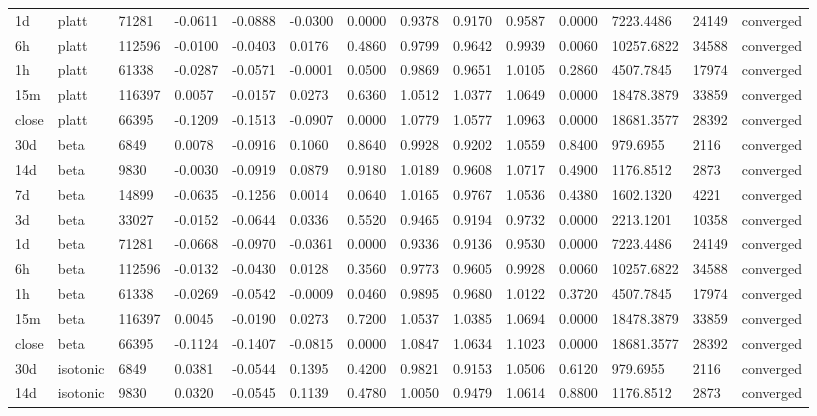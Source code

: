 \begin{tabular}{llllllllllllll}
1d & platt & 71281 & -0.0611 & -0.0888 & -0.0300 & 0.0000 & 0.9378 & 0.9170 & 0.9587 & 0.0000 & 7223.4486 & 24149 & converged \\
6h & platt & 112596 & -0.0100 & -0.0403 & 0.0176 & 0.4860 & 0.9799 & 0.9642 & 0.9939 & 0.0060 & 10257.6822 & 34588 & converged \\
1h & platt & 61338 & -0.0287 & -0.0571 & -0.0001 & 0.0500 & 0.9869 & 0.9651 & 1.0105 & 0.2860 & 4507.7845 & 17974 & converged \\
15m & platt & 116397 & 0.0057 & -0.0157 & 0.0273 & 0.6360 & 1.0512 & 1.0377 & 1.0649 & 0.0000 & 18478.3879 & 33859 & converged \\
close & platt & 66395 & -0.1209 & -0.1513 & -0.0907 & 0.0000 & 1.0779 & 1.0577 & 1.0963 & 0.0000 & 18681.3577 & 28392 & converged \\
30d & beta & 6849 & 0.0078 & -0.0916 & 0.1060 & 0.8640 & 0.9928 & 0.9202 & 1.0559 & 0.8400 & 979.6955 & 2116 & converged \\
14d & beta & 9830 & -0.0030 & -0.0919 & 0.0879 & 0.9180 & 1.0189 & 0.9608 & 1.0717 & 0.4900 & 1176.8512 & 2873 & converged \\
7d & beta & 14899 & -0.0635 & -0.1256 & 0.0014 & 0.0640 & 1.0165 & 0.9767 & 1.0536 & 0.4380 & 1602.1320 & 4221 & converged \\
3d & beta & 33027 & -0.0152 & -0.0644 & 0.0336 & 0.5520 & 0.9465 & 0.9194 & 0.9732 & 0.0000 & 2213.1201 & 10358 & converged \\
1d & beta & 71281 & -0.0668 & -0.0970 & -0.0361 & 0.0000 & 0.9336 & 0.9136 & 0.9530 & 0.0000 & 7223.4486 & 24149 & converged \\
6h & beta & 112596 & -0.0132 & -0.0430 & 0.0128 & 0.3560 & 0.9773 & 0.9605 & 0.9928 & 0.0060 & 10257.6822 & 34588 & converged \\
1h & beta & 61338 & -0.0269 & -0.0542 & -0.0009 & 0.0460 & 0.9895 & 0.9680 & 1.0122 & 0.3720 & 4507.7845 & 17974 & converged \\
15m & beta & 116397 & 0.0045 & -0.0190 & 0.0273 & 0.7200 & 1.0537 & 1.0385 & 1.0694 & 0.0000 & 18478.3879 & 33859 & converged \\
close & beta & 66395 & -0.1124 & -0.1407 & -0.0815 & 0.0000 & 1.0847 & 1.0634 & 1.1023 & 0.0000 & 18681.3577 & 28392 & converged \\
30d & isotonic & 6849 & 0.0381 & -0.0544 & 0.1395 & 0.4200 & 0.9821 & 0.9153 & 1.0506 & 0.6120 & 979.6955 & 2116 & converged \\
14d & isotonic & 9830 & 0.0320 & -0.0545 & 0.1139 & 0.4780 & 1.0050 & 0.9479 & 1.0614 & 0.8800 & 1176.8512 & 2873 & converged \\

\end{tabular}
